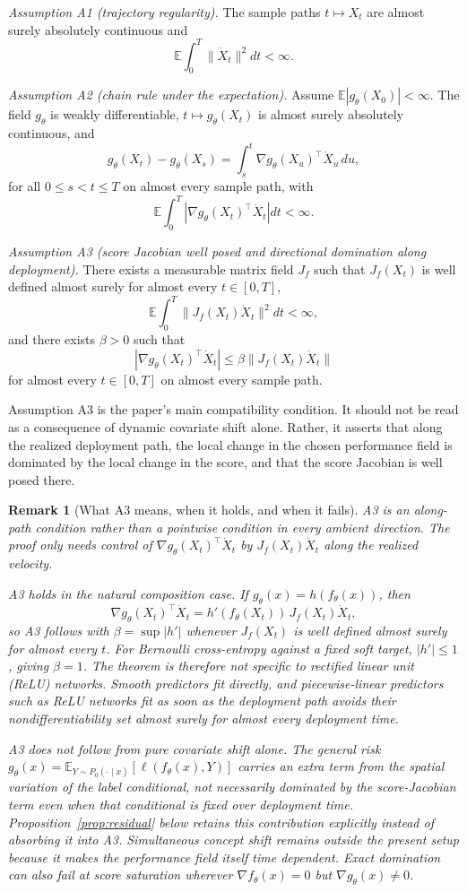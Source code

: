 \documentclass[conference]{IEEEtran}
\newtheorem{remark}{Remark}
\newcommand{\E}{\mathbb{E}}
\begin{document}
\textit{Assumption A1 (trajectory regularity).} The sample paths $t\mapsto X_t$ are almost surely absolutely continuous and
\[
\E\int_0^T \|\dot X_t\|^2dt < \infty.
\]

\textit{Assumption A2 (chain rule under the expectation).} Assume $\E|g_\theta(X_0)|<\infty$. The field $g_\theta$ is weakly differentiable, $t\mapsto g_\theta(X_t)$ is almost surely absolutely continuous, and
\[
g_\theta(X_t)-g_\theta(X_s)=\int_s^t \nabla g_\theta(X_u)^\top \dot X_u\,du,
\]
for all $0\le s<t\le T$ on almost every sample path, with
\[
\E\int_0^T |\nabla g_\theta(X_t)^\top \dot X_t|dt < \infty.
\]

\textit{Assumption A3 (score Jacobian well posed and directional domination along deployment).} There exists a measurable matrix field $J_f$ such that $J_f(X_t)$ is well defined almost surely for almost every $t\in[0,T]$,
\[
\E\int_0^T \|J_f(X_t)\dot X_t\|^2dt < \infty,
\]
and there exists $\beta>0$ such that
\[
|\nabla g_\theta(X_t)^\top \dot X_t| \le \beta \|J_f(X_t)\dot X_t\|
\]
for almost every $t\in[0,T]$ on almost every sample path.

Assumption A3 is the paper's main compatibility condition. It should not be read as a consequence of dynamic covariate shift alone. Rather, it asserts that along the realized deployment path, the local change in the chosen performance field is dominated by the local change in the score, and that the score Jacobian is well posed there.

\begin{remark}[What A3 means, when it holds, and when it fails]
\label{rem:a3}
A3 is an along-path condition rather than a pointwise condition in every ambient direction. The proof only needs control of $\nabla g_\theta(X_t)^\top \dot X_t$ by $J_f(X_t)\dot X_t$ along the realized velocity.

A3 holds in the natural composition case. If $g_\theta(x)=h(f_\theta(x))$, then
\[
\nabla g_\theta(X_t)^\top \dot X_t
=
h'(f_\theta(X_t))\,J_f(X_t)\dot X_t,
\]
so A3 follows with $\beta=\sup|h'|$ whenever $J_f(X_t)$ is well defined almost surely for almost every $t$. For Bernoulli cross-entropy against a fixed soft target, $|h'|\le 1$, giving $\beta=1$. The theorem is therefore not specific to rectified linear unit (ReLU) networks. Smooth predictors fit directly, and piecewise-linear predictors such as ReLU networks fit as soon as the deployment path avoids their nondifferentiability set almost surely for almost every deployment time.

A3 does not follow from pure covariate shift alone. The general risk $g_\theta(x)=\E_{Y\sim P_0(\cdot\mid x)}[\ell(f_\theta(x),Y)]$ carries an extra term from the spatial variation of the label conditional, not necessarily dominated by the score-Jacobian term even when that conditional is fixed over deployment time. Proposition~\ref{prop:residual} below retains this contribution explicitly instead of absorbing it into A3. Simultaneous concept shift remains outside the present setup because it makes the performance field itself time dependent. Exact domination can also fail at score saturation wherever $\nabla f_\theta(x)=0$ but $\nabla g_\theta(x)\neq 0$.
\end{remark}
\end{document}
